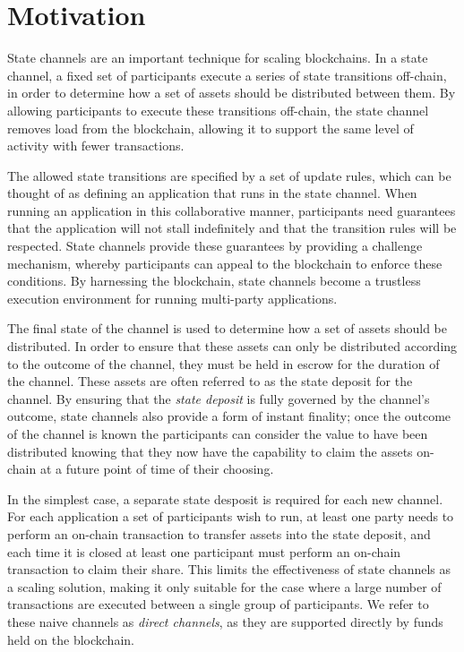 \section{Motivation}

State channels are an important technique for scaling blockchains.
In a state channel, a fixed set of participants execute a series of state transitions off-chain, in order to determine how a set of assets should be distributed between them.
By allowing participants to execute these transitions off-chain, the state channel removes load from the blockchain, allowing it to support the same level of activity with fewer transactions.

The allowed state transitions are specified by a set of update rules, which can be thought of as defining an application that runs in the state channel.
When running an application in this collaborative manner, participants need guarantees that the application will not stall indefinitely and that the transition rules will be respected.
State channels provide these guarantees by providing a challenge mechanism, whereby participants can appeal to the blockchain to enforce these conditions.
By harnessing the blockchain, state channels become a trustless execution environment for running multi-party applications.


The final state of the channel is used to determine how a set of assets should be distributed.
In order to ensure that these assets can only be distributed according to the outcome of the channel, they must be held in escrow for the duration of the channel.
These assets are often referred to as the state deposit for the channel.
By ensuring that the \textit{state deposit} is fully governed by the channel's outcome, state channels also provide a form of instant finality; 
once the outcome of the channel is known the participants can consider the value to have been distributed knowing that they now have the capability to claim the assets on-chain at a future point of time of their choosing.

In the simplest case, a separate state desposit is required for each new channel.
For each application a set of participants wish to run, at least one party needs to perform an on-chain transaction to transfer assets into the state deposit, and each time it is closed at least one participant must perform an on-chain transaction to claim their share.
This limits the effectiveness of state channels as a scaling solution, making it only suitable for the case where a large number of transactions are executed between a single group of participants.
We refer to these naive channels as \textit{direct channels}, as they are supported directly by funds held on the blockchain.

